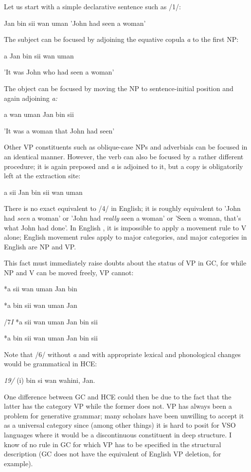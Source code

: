 Let us start with a simple declarative sentence such as /1/:

\ea\label{ex:1}
 Jan bin sii wan uman 'John had seen a woman'
\glt
\z

The subject can be focused by adjoining the equative copula \textit{a} to the first NP:

\ea\label{ex:2}
 a Jan bin sii wan uman
\glt
\z

'It was John who had seen a woman'

The object can be focused by moving the NP to sentence-initial position and again adjoining \textit{a:}

\ea\label{ex:3}
 a wan uman Jan bin sii
\glt
\z

'It was a woman that John had seen'

Other VP constituents such as oblique-case NPs and adverbials can be focused in an identical manner. However, the verb can also be focused by a rather different procedure; it is again preposed and \textit{a} is adjoined to it, but a copy is obligatorily left at the extraction site:

\ea\label{ex:4}
 a sii Jan bin sii wan uman
\glt
\z

There is no exact equivalent to /4/ in English; it is roughly equivalent to 'John had \textit{seen} a woman' or 'John had \textit{really }seen a woman' or 'Seen a woman, that's what John had done'. In English , it is impossible to apply a movement rule to V alone; English movement rules apply to major categories, and major categories in English are NP and VP.

This fact must immediately raise doubts about the status of
VP in GC, for while NP and V can be moved freely, VP cannot:

\ea\label{ex:5}
 *a sii wan uman Jan bin
\glt
\z

\ea\label{ex:6}
 *a bin sii wan uman Jan
\glt
\z

/7\textit{I} *a sii wan uman Jan bin sii

\ea\label{ex:8}
 *a bin sii wan uman Jan bin sii
\glt
\z

Note that /6/ without \textit{a} and with appropriate lexical and phonological changes would be grammatical in HCE:

\textit{19/ }(i) bin si wan wahini, Jan.

One difference between GC and HCE could then be due to the fact that the latter has the category VP while the former does not. VP has always been a problem for generative grammar; many scholars
have been unwilling to accept it as a universal category since (among
other things) it is hard to posit for VSO languages where it would be a discontinuous constituent in deep structure. I know of no rule in GC for which VP has to be specified in the structural description (GC does not have the equivalent of English VP deletion, for example).

